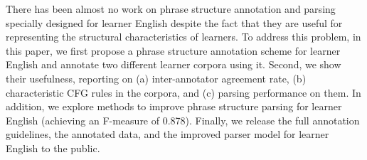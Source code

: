 There has been almost no work on phrase structure annotation and parsing specially designed for learner English despite the fact that they are useful for representing the structural characteristics of learners. To address this problem, in this paper, we first propose a phrase structure annotation scheme for learner English and annotate two different learner corpora using it. Second, we show their usefulness, reporting on (a) inter-annotator agreement rate, (b) characteristic CFG rules in the corpora, and (c) parsing performance on them. In addition, we explore methods to improve phrase structure parsing for learner English (achieving an F-measure of 0.878). Finally, we release the full annotation guidelines, the annotated data, and the improved parser model for learner English to the public.

